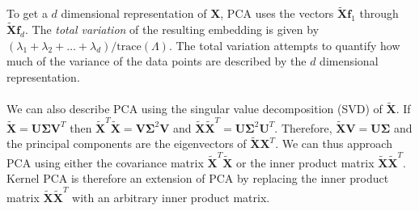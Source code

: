 To get a $d$ dimensional representation of $\mathbf{X}$, PCA uses the
vectors $\tilde{\mathbf{X}}\mathbf{f}_1$ through
$\tilde{\mathbf{X}}\mathbf{f}_d$. The \emph{total variation} of the
resulting embedding is given by $(\lambda_1 + \lambda_2 + \dots +
\lambda_d)/\mathrm{trace}(\Lambda)$. The total variation attempts to
quantify how much of the variance of the data points are described by
the $d$ dimensional representation. \\ \\
%
%
\noindent
We can also describe PCA using the singular value decomposition (SVD)
of $\tilde{\mathbf{X}}$. If $\tilde{\mathbf{X}} = \mathbf{U} \bm{\Sigma}
\mathbf{V}^{T}$ then
$\tilde{\mathbf{X}}^{T}\tilde{\mathbf{X}} = \mathbf{V} \bm{\Sigma}^{2}
\mathbf{V}$ and $\tilde{\mathbf{X}}\tilde{\mathbf{X}}^{T} =
\mathbf{U}\bm{\Sigma}^{2} \mathbf{U}^{T}$. Therefore,
$\tilde{\mathbf{X}}\mathbf{V} = \mathbf{U}\mathbf{\Sigma}$ and 
the principal components are the eigenvectors of
$\tilde{\mathbf{X}}\mathbf{X}^{T}$. We can thus approach PCA using
either the covariance matrix
$\tilde{\mathbf{X}}^{T}\tilde{\mathbf{X}}$ or the inner product matrix
$\tilde{\mathbf{X}}\tilde{\mathbf{X}}^{T}$. Kernel PCA
\citet{scholkopf97:_lectur_notes_comput_scien} is therefore an
extension of PCA by replacing the inner product matrix
$\tilde{\mathbf{X}}\tilde{\mathbf{X}}^{T}$ with an arbitrary inner
product matrix.  
